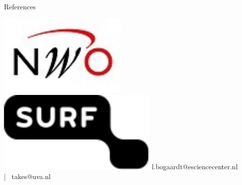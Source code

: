 \documentclass[final]{beamer}
\newlength{\sepwid}
\newlength{\onecolwid}
\begin{document}
\begin{frame}[t]
\begin{columns}[t]
\begin{column}{\onecolwid}
\begin{alertblock}{References}
\end{alertblock}

\centering \includegraphics[height=40mm]{NWO.jpg} \hspace{24mm} \includegraphics[height=40mm]{Surf.png}
l.bogaardt@esciencecenter.nl \, | \, takes@uva.nl

\end{column} %

\begin{column}{\sepwid}\end{column} %

\end{columns} %

\end{frame} %
\end{document}
